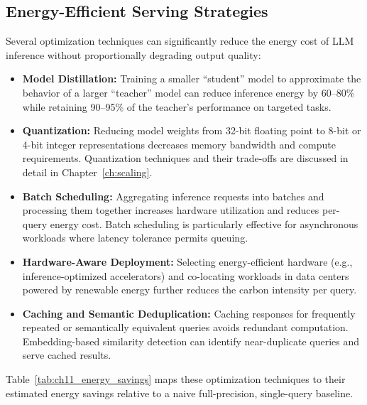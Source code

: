 \subsection{Energy-Efficient Serving Strategies}\label{sec:ch11_energy_serving}

Several optimization techniques can significantly reduce the energy cost of LLM inference without proportionally degrading output quality:

\begin{itemize}
    \item \textbf{Model Distillation:} Training a smaller ``student'' model to approximate the behavior of a larger ``teacher'' model can reduce inference energy by 60--80\% while retaining 90--95\% of the teacher's performance on targeted tasks.
    \item \textbf{Quantization:} Reducing model weights from 32-bit floating point to 8-bit or 4-bit integer representations decreases memory bandwidth and compute requirements. Quantization techniques and their trade-offs are discussed in detail in Chapter~\ref{ch:scaling}.
    \item \textbf{Batch Scheduling:} Aggregating inference requests into batches and processing them together increases hardware utilization and reduces per-query energy cost. Batch scheduling is particularly effective for asynchronous workloads where latency tolerance permits queuing.
    \item \textbf{Hardware-Aware Deployment:} Selecting energy-efficient hardware (e.g., inference-optimized accelerators) and co-locating workloads in data centers powered by renewable energy further reduces the carbon intensity per query.
    \item \textbf{Caching and Semantic Deduplication:} Caching responses for frequently repeated or semantically equivalent queries avoids redundant computation. Embedding-based similarity detection can identify near-duplicate queries and serve cached results.
\end{itemize}

Table~\ref{tab:ch11_energy_savings} maps these optimization techniques to their estimated energy savings relative to a naive full-precision, single-query baseline.

